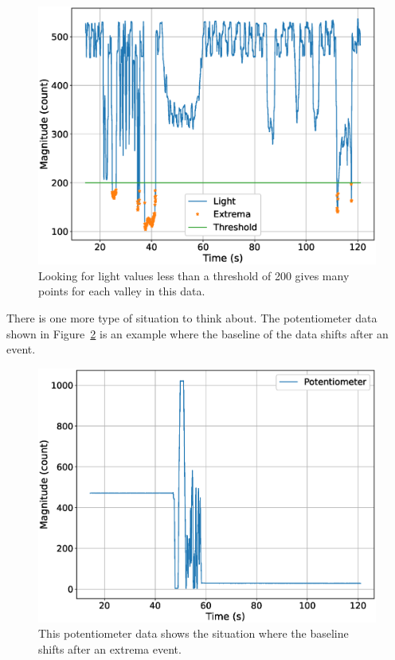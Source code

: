 \begin{figure}[!htb]
	\centering
	\includegraphics[scale=0.4]{information/light-thresh.eps}
	\caption{Looking for light values less than a threshold of 200 gives many points for each valley
    in this data.}
	\label{fig:lightthresh}
\end{figure}

There is one more type of situation to think about. The potentiometer data shown in 
Figure~\ref{fig:potvalues} is an example where the baseline of the data shifts after an event.

\begin{figure}[!htb]
	\centering
	\includegraphics[scale=0.4]{information/pot.eps}
	\caption{This potentiometer data shows the situation where the baseline shifts after 
    an extrema event.}
	\label{fig:potvalues}
\end{figure}

